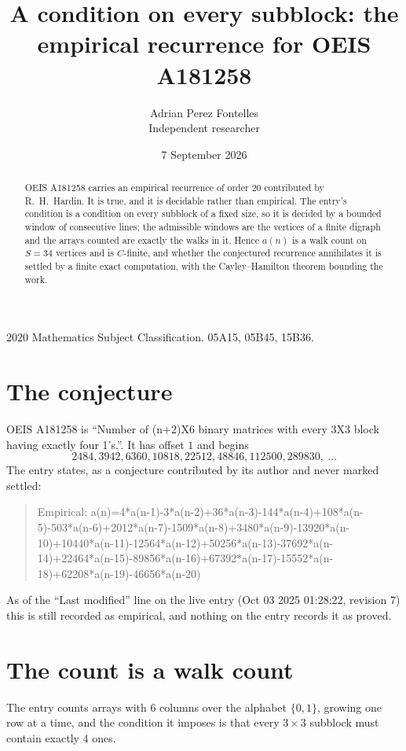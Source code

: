 \documentclass[11pt,a4paper]{article}
\title{A condition on every subblock: the empirical recurrence for OEIS A181258}
\author{Adrian Perez Fontelles\\ \small Independent researcher}
\date{7 September 2026}
\theoremstyle{plain}
\theoremstyle{definition}
\begin{document}
\maketitle

\begin{abstract}
OEIS A181258 carries an empirical recurrence of order $20$ contributed by R.~H.~Hardin. It is
true, and it is decidable rather than empirical. The entry's condition is a condition on every
subblock of a fixed size, so it is decided by a bounded window of consecutive lines; the
admissible windows are the vertices of a finite digraph and the arrays counted are exactly the
walks in it. Hence $a(n)$ is a walk count on $S=34$ vertices and is $C$-finite, and whether the
conjectured recurrence annihilates it is settled by a finite exact computation, with the
Cayley--Hamilton theorem bounding the work.
\end{abstract}

\noindent\small 2020 Mathematics Subject Classification. 05A15, 05B45, 15B36.\normalsize

\section{The conjecture}

OEIS A181258 is ``Number of (n+2)X6 binary matrices with every 3X3 block having exactly four 1's.''. It has offset $1$ and begins
\[
2484, 3942, 6360, 10818, 22512, 48846, 112500, 289830,\ \dots
\]
The entry states, as a conjecture contributed by its author and never marked settled:
\begin{quote}
Empirical: a(n)=4*a(n-1)-3*a(n-2)+36*a(n-3)-144*a(n-4)+108*a(n-5)-503*a(n-6)+2012*a(n-7)-1509*a(n-8)+3480*a(n-9)-13920*a(n-10)+10440*a(n-11)-12564*a(n-12)+50256*a(n-13)-37692*a(n-14)+22464*a(n-15)-89856*a(n-16)+67392*a(n-17)-15552*a(n-18)+62208*a(n-19)-46656*a(n-20)
\end{quote}
As of the ``Last modified'' line on the live entry (Oct 03 2025 01:28:22, revision 7) this is still
recorded as empirical, and nothing on the entry records it as proved.

\section{The count is a walk count}

The entry counts arrays with $6$ columns over the alphabet $\{0,1\}$, growing one row at a time, and the condition it imposes is that every $3\times3$ subblock must contain exactly $4$ ones.
\end{document}
